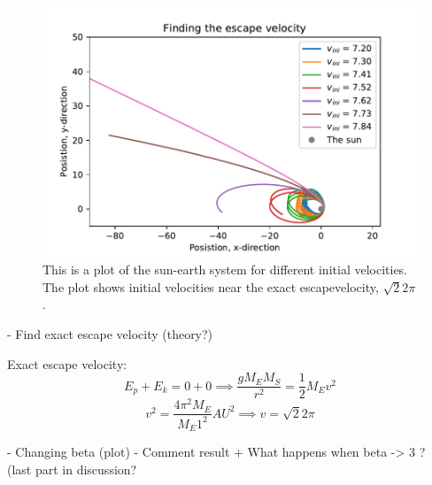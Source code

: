 \begin{figure}[H]
\includegraphics[width=1.1\linewidth]{../results/plots/escape_velocity.pdf}\caption{This is a plot of the sun-earth system for different initial velocities. The plot shows initial velocities near the exact escapevelocity, $\sqrt{2}2\pi$.}\label{fig:escape_velocity_near_exact}
\end{figure}

	- Find exact escape velocity (theory?)

Exact escape velocity:
$$ E_p + E_k = 0 + 0 \implies \frac{g M_E M_S}{r^2} =\frac{1}{2}M_Ev^2$$
$$ v^2 = \frac{4 \pi^2 M_E}{M_E  1^2} AU^2 \implies v = \sqrt{2}2\pi$$

	- Changing beta (plot)
		- Comment result + What happens when beta -> 3 ? (last part in discussion?

